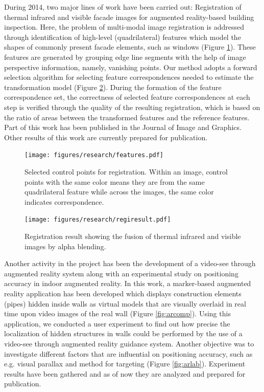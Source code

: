 {\begin{enumerate}
{During 2014, two major lines of work have been carried out: Registration of thermal infrared and visible facade images for augmented reality-based building inspection. Here, the problem of multi-modal image registration is addressed through identification of high-level (quadrilateral) features which model the shapes of commonly present facade elements, such as windows (Figure \ref{fig:regone}). These features are generated by grouping edge line segments with the help of image perspective information, namely, vanishing points. Our method adopts a forward selection algorithm for selecting feature correspondences needed to estimate the transformation model (Figure \ref{fig:regtwo}). During the formation of the feature correspondence set, the correctness of selected feature correspondences at each step is verified through the quality of the resulting registration, which is based on the ratio of areas between the transformed features and the reference features. Part of this work has been published in the Journal of Image and Graphics. Other results of this work are currently prepared for publication.}

\begin{figure}[!htbp]
\centering
\texttt{[image: figures/research/features.pdf]}
\caption{\label{fig:regone} Selected control points for registration. Within an image, control points with the same color means they are from the same quadrilateral feature while across the images, the same color indicates correspondence.} 
\end{figure}

\begin{figure}[!htbp]
\centering
\texttt{[image: figures/research/regiresult.pdf]}
\caption{\label{fig:regtwo} Registration result showing the fusion of thermal infrared and visible images by alpha blending.} 
\end{figure}

Another activity in the project has been the development of a video-see through augmented reality system along with an experimental study on positioning accuracy in indoor augmented reality. In this work, a marker-based augmented reality application has been developed which displays construction elements (pipes) hidden inside walls as virtual models that are visually overlaid in real time upon video images of the real wall (Figure \ref{fig:arcomp}). Using this application, we conducted a user experiment to find out how precise the localization of hidden structures in walls could be performed by the use of a video-see through augmented reality guidance system. Another objective was to investigate different factors that are influential on positioning accuracy, such as e.g. visual parallax and method for targeting (Figure \ref{fig:arlab}). Experiment results have been gathered and as of now they are analyzed and prepared for publication. 


\end{enumerate}}
